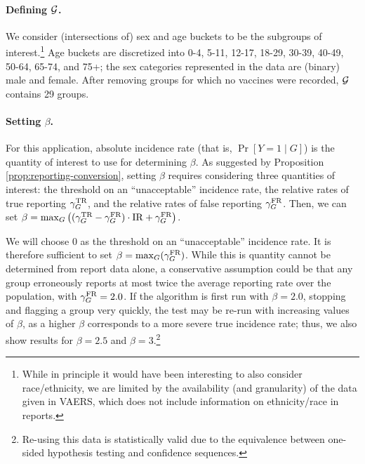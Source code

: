 \paragraph{Defining ${\mathcal{G}}$.} 
We consider (intersections of) sex and age buckets to be the subgroups of interest.\footnote{While in principle it would have been interesting to also consider race/ethnicity, we are limited by the availability (and granularity) of the data given in VAERS, which does not include information on ethnicity/race in reports.}  Age buckets are discretized into 0-4, 5-11, 12-17, 18-29, 30-39, 40-49, 50-64, 65-74, and 75+; the sex categories represented in the data are (binary) male and female. After removing groups for which no vaccines were recorded, ${\mathcal{G}}$ contains 29 groups. 

\paragraph{Setting $\beta$.}
For this application, absolute incidence rate (that is, $\Pr[Y = 1 \mid G]$) is the quantity of interest to use for determining $\beta$.
As suggested by Proposition \ref{prop:reporting-conversion}, setting $\beta$ requires considering three quantities of interest: the threshold on an ``unacceptable'' incidence rate, the relative rates of true reporting ${\gamma_G^{\text{TR}}}$, and the relative rates of false reporting ${\gamma_G^{\text{FR}}}$. Then, we can set $\beta = \max_G \left(({\gamma_G^{\text{TR}}}-{\gamma_G^{\text{FR}}})\cdot \mathrm{IR} + {\gamma_G^{\text{FR}}}\right)$. 

We will choose 0 as the threshold on an ``unacceptable'' incidence rate.\iftoggle{icml}{}{\footnote{One might follow existing practice and use the per-group expected rate of myocarditis to benchmark an unacceptable incidence rate (e.g. as provided in Table 2 of \citet{oster2022myocarditis}, which suggests at most 2 cases per million doses). 
However, in addition to this expected incidence rate being very small (and, for any practical purposes, being vastly dominated by the other reporting terms), it also implicitly relies on reports so that the benchmark quantities are  $r \cdot \mathrm{IR}$, rather than just $\mathrm{IR}$, and thus depend on the unknown reporting rate $r$.}}
It is therefore sufficient to set $\beta = \max_G({\gamma_G^{\text{FR}}})$. While this is quantity cannot be determined from report data alone, a conservative assumption could be that any group erroneously reports at most twice the average reporting rate  over the population, with ${\gamma_G^{\text{FR}}} = 2.0$. 
If the algorithm is first run with $\beta=2.0$, stopping and flagging a group very quickly, the test may be re-run with increasing values of $\beta$, as a higher $\beta$ corresponds to a more severe true incidence rate; thus, we also show results for $\beta=2.5$ and $\beta=3$.\footnote{Re-using this data is statistically valid due to the equivalence between one-sided hypothesis testing and confidence sequences.}

